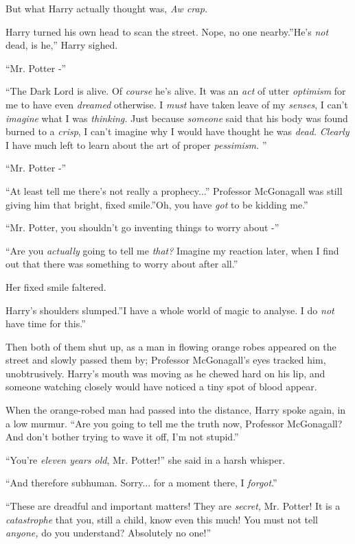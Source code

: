 But what Harry actually thought was, \emph{Aw crap.}

Harry turned his own head to scan the street. Nope, no one nearby.''He's
\emph{not} dead, is he,'' Harry sighed.

``Mr. Potter -''

``The Dark Lord is alive. Of \emph{course} he's alive. It was an
\emph{act} of utter \emph{optimism} for me to have even \emph{dreamed}
otherwise. I \emph{must} have taken leave of my \emph{senses}, I can't
\emph{imagine} what I was \emph{thinking.} Just because \emph{someone}
said that his body was found burned to a \emph{crisp}, I can't imagine
why I would have thought he was \emph{dead.} \emph{Clearly} I have much
left to learn about the art of proper \emph{pessimism.} ''

``Mr. Potter -''

``At least tell me there's not really a prophecy...'' Professor
McGonagall was still giving him that bright, fixed smile.''Oh, you have
\emph{got} to be kidding me.''

``Mr. Potter, you shouldn't go inventing things to worry about -''

``Are you \emph{actually} going to tell me \emph{that?} Imagine my
reaction later, when I find out that there was something to worry about
after all.''

Her fixed smile faltered.

Harry's shoulders slumped.''I have a whole world of magic to analyse. I
do \emph{not} have time for this.''

Then both of them shut up, as a man in flowing orange robes appeared on
the street and slowly passed them by; Professor McGonagall's eyes
tracked him, unobtrusively. Harry's mouth was moving as he chewed hard
on his lip, and someone watching closely would have noticed a tiny spot
of blood appear.

When the orange-robed man had passed into the distance, Harry spoke
again, in a low murmur. ``Are you going to tell me the truth now,
Professor McGonagall? And don't bother trying to wave it off, I'm not
stupid.''

``You're \emph{eleven years old}, Mr. Potter!'' she said in a harsh
whisper.

``And therefore subhuman. Sorry... for a moment there, I
\emph{forgot}.''

``These are dreadful and important matters! They are \emph{secret,} Mr.
Potter! It is a \emph{catastrophe} that you, still a child, know even
this much! You must not tell \emph{anyone,} do you understand?
Absolutely no one!''

